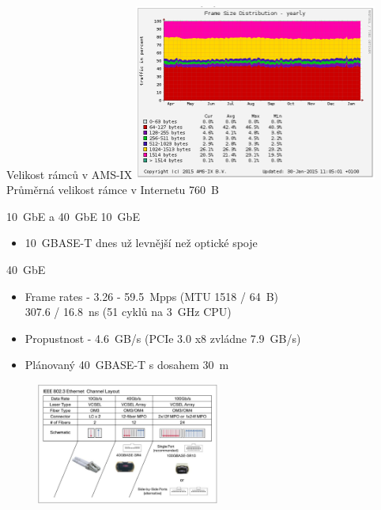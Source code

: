 \documentclass{beamer}
\begin{document}
\begin{frame}{Velikost rámců v AMS-IX}
	\centering
	\includegraphics[width=8cm,keepaspectratio]{fig/amsix.png} \\
	Průměrná velikost rámce v Internetu 760~B
\end{frame}

\begin{frame}{10~GbE a 40~GbE}
	10~GbE
	\begin{itemize}
		\item 10~GBASE-T dnes už levnější než optické spoje
	\end{itemize}
	40~GbE
	\begin{itemize}
		\item Frame rates - 3.26 - 59.5~Mpps (MTU 1518 / 64~B) \\
		307.6 / 16.8~ns (51 cyklů na 3~GHz CPU)
		\item Propustnost - 4.6~GB/s (PCIe 3.0 x8 zvládne 7.9~GB/s)
		\item Plánovaný 40~GBASE-T s dosahem 30~m
	\end{itemize}
	\begin{figure}
		\centering
		\includegraphics[width=6cm,keepaspectratio]{fig/ethernet-layout.png}
	\end{figure}
\end{frame}
\end{document}
